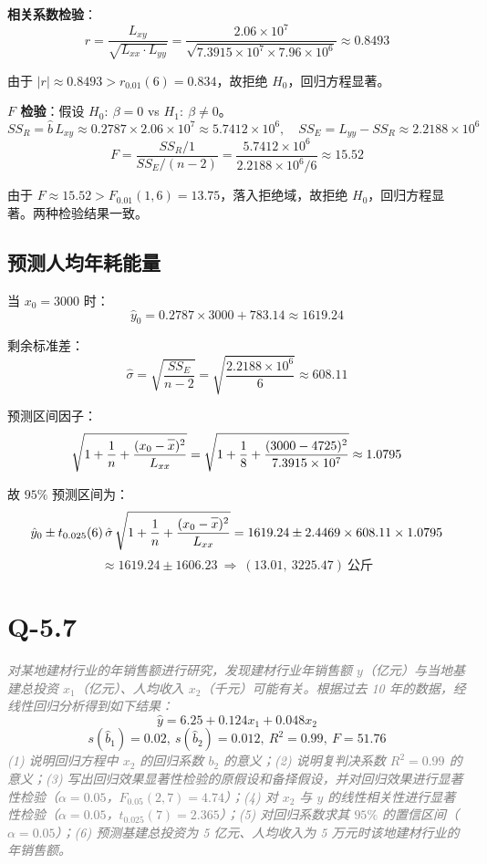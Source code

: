 \documentclass{article}
\newcommand{\barline}[1]{\overline{#1\rule{0pt}{1.5ex}}}
\begin{document}
\textbf{相关系数检验}：
\[ r=\dfrac{L_{xy}}{\sqrt{L_{xx}\cdot L_{yy}}}=\dfrac{2.06\times 10^7}{\sqrt{7.3915\times 10^7\times 7.96\times 10^6}}\approx 0.8493 \]

由于 $|r|\approx 0.8493>r_{0.01}(6)=0.834$，故拒绝 $H_0$，回归方程显著。

\textbf{$F$ 检验}：假设 $H_0:\ \beta=0$ vs $H_1:\ \beta\neq 0$。
\[ SS_R=\hat{b}\,L_{xy}\approx 0.2787\times 2.06\times 10^7\approx 5.7412\times 10^6,\quad SS_E=L_{yy}-SS_R\approx 2.2188\times 10^6 \]
\[ F=\dfrac{SS_R/1}{SS_E/(n-2)}=\dfrac{5.7412\times 10^6}{2.2188\times 10^6/6}\approx 15.52 \]

由于 $F\approx 15.52>F_{0.01}(1,6)=13.75$，落入拒绝域，故拒绝 $H_0$，回归方程显著。两种检验结果一致。

\subsection{预测人均年耗能量}

当 $x_0=3000$ 时：
\[ \hat{y}_0=0.2787\times 3000+783.14\approx 1619.24 \]

剩余标准差：
\[ \hat{\sigma}=\sqrt{\dfrac{SS_E}{n-2}}=\sqrt{\dfrac{2.2188\times 10^6}{6}}\approx 608.11 \]

预测区间因子：
\[ \sqrt{1+\dfrac{1}{n}+\dfrac{(x_0-\barline{x})^2}{L_{xx}}}=\sqrt{1+\dfrac{1}{8}+\dfrac{(3000-4725)^2}{7.3915\times 10^7}}\approx 1.0795 \]

故 $95\%$ 预测区间为：
\[ \hat{y}_0\pm t_{0.025}(6)\,\hat{\sigma}\,\sqrt{1+\dfrac{1}{n}+\dfrac{(x_0-\barline{x})^2}{L_{xx}}}=1619.24\pm 2.4469\times 608.11\times 1.0795 \]
\[ \approx 1619.24\pm 1606.23\ \Rightarrow\ (13.01,\ 3225.47)\ \text{公斤} \]



\section{Q-5.7}
\textit{\textcolor{gray}{对某地建材行业的年销售额进行研究，发现建材行业年销售额 $y$（亿元）与当地基建总投资 $x_1$（亿元）、人均收入 $x_2$（千元）可能有关。根据过去 10 年的数据，经线性回归分析得到如下结果：}
\[ \hat{y}=6.25+0.124x_1+0.048x_2 \]
\[ s(\hat{b}_1)=0.02,\ s(\hat{b}_2)=0.012,\ R^2=0.99,\ F=51.76 \]
\textcolor{gray}{(1) 说明回归方程中 $x_2$ 的回归系数 $b_2$ 的意义；(2) 说明复判决系数 $R^2=0.99$ 的意义；(3) 写出回归效果显著性检验的原假设和备择假设，并对回归效果进行显著性检验（$\alpha=0.05$，$F_{0.05}(2,7)=4.74$）；(4) 对 $x_2$ 与 $y$ 的线性相关性进行显著性检验（$\alpha=0.05$，$t_{0.025}(7)=2.365$）；(5) 对回归系数求其 $95\%$ 的置信区间（$\alpha=0.05$）；(6) 预测基建总投资为 5 亿元、人均收入为 5 万元时该地建材行业的年销售额。}
}
\end{document}
